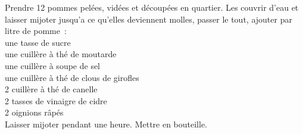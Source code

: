 \begin{minipage}[c]{\textwidth}
Prendre 12 pommes pelées, vidées et découpées en quartier. Les couvrir d'eau et laisser mijoter jusqu'a ce qu'elles deviennent molles, passer le tout, ajouter par litre de pomme :\\
une tasse de sucre\\
une cuillère à thé de moutarde\\
une cuillère à soupe de sel\\
une cuillère à thé de clous de girofles\\
2 cuillère à thé de canelle\\
2 tasses de vinaigre de cidre\\
2 oignions râpés\\
Laisser mijoter pendant une heure. Mettre en bouteille.\\
\\

\end{minipage}

